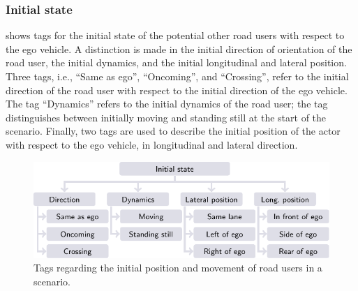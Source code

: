 \subsubsection{Initial state}
\label{sec:initial state}

 shows tags for the initial state of the potential other road users with respect to the ego vehicle. A distinction is made in the initial direction of orientation of the road user, the initial dynamics, and the initial longitudinal and lateral position. Three tags, i.e., ``Same as ego'', ``Oncoming'', and ``Crossing'', refer to the initial direction of the road user with respect to the initial direction of the ego vehicle. %
The tag ``Dynamics'' refers to the initial dynamics of the road user; the tag distinguishes between initially moving and standing still at the start of the scenario. 
Finally, two tags are used to describe the initial position of the actor with respect to the ego vehicle, in longitudinal and lateral direction. 

\begin{figure}[t]
	\centering
	\includegraphics{figures/initial_state}
	\caption{Tags regarding the initial position and movement of road users in a scenario.}
	\label{fig:tree initial state}
\end{figure}

